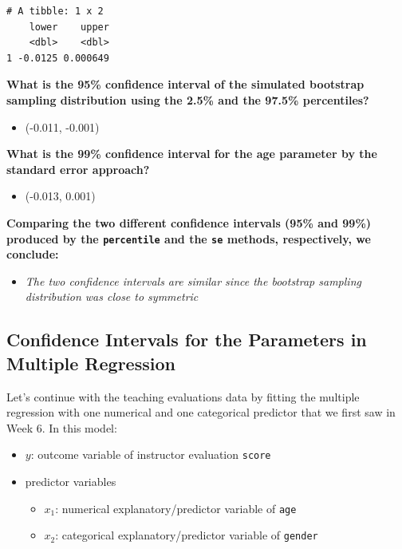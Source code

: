 \documentclass[]{article}
\providecommand{\tightlist}{%
  \setlength{\itemsep}{0pt}\setlength{\parskip}{0pt}}
\begin{document}
\begin{verbatim}
# A tibble: 1 x 2
    lower    upper
    <dbl>    <dbl>
1 -0.0125 0.000649
\end{verbatim}

\textbf{What is the 95\% confidence interval of the simulated bootstrap
sampling distribution using the 2.5\% and the 97.5\% percentiles?}

\begin{itemize}
\tightlist
\item
  (-0.011, -0.001)
\end{itemize}

\textbf{What is the 99\% confidence interval for the age parameter by
the standard error approach?}

\begin{itemize}
\tightlist
\item
  (-0.013, 0.001)
\end{itemize}

\textbf{Comparing the two different confidence intervals (95\% and 99\%)
produced by the \texttt{percentile} and the \texttt{se} methods,
respectively, we conclude:}

\begin{itemize}
\tightlist
\item
  \emph{The two confidence intervals are similar since the bootstrap
  sampling distribution was close to symmetric}
\end{itemize}

\subsection{Confidence Intervals for the Parameters in Multiple
Regression}\label{confidence-intervals-for-the-parameters-in-multiple-regression}

Let's continue with the teaching evaluations data by fitting the
multiple regression with one numerical and one categorical predictor
that we first saw in Week 6. In this model:

\begin{itemize}
\tightlist
\item
  \(y\): outcome variable of instructor evaluation \texttt{score}
\item
  predictor variables

  \begin{itemize}
  \tightlist
  \item
    \(x_1\): numerical explanatory/predictor variable of \texttt{age}
  \item
    \(x_2\): categorical explanatory/predictor variable of
    \texttt{gender}
  \end{itemize}
\end{itemize}
\end{document}
